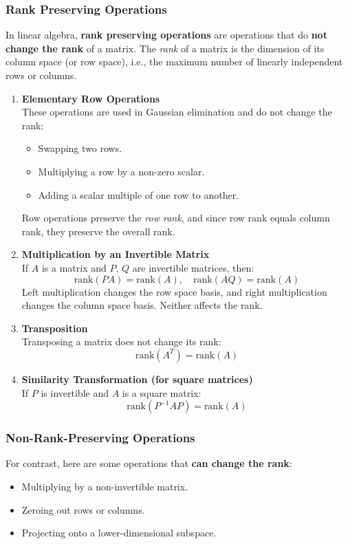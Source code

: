 \subsubsection{Rank Preserving Operations}

In linear algebra, \textbf{rank preserving operations} are operations that do \textbf{not change the rank} of a matrix. The \textit{rank} of a matrix is the dimension of its column space (or row space), i.e., the maximum number of linearly independent rows or columns.

\vspace{0.5em}


\begin{enumerate}
    \item \textbf{Elementary Row Operations} \\
    These operations are used in Gaussian elimination and do not change the rank:
    \begin{itemize}
        \item Swapping two rows.
        \item Multiplying a row by a non-zero scalar.
        \item Adding a scalar multiple of one row to another.
    \end{itemize}
    Row operations preserve the \textit{row rank}, and since row rank equals column rank, they preserve the overall rank.

    \item \textbf{Multiplication by an Invertible Matrix} \\
    If $A$ is a matrix and $P$, $Q$ are invertible matrices, then:
    \[
        \text{rank}(PA) = \text{rank}(A), \quad \text{rank}(AQ) = \text{rank}(A)
    \]
    Left multiplication changes the row space basis, and right multiplication changes the column space basis. Neither affects the rank.

    \item \textbf{Transposition} \\
    Transposing a matrix does not change its rank:
    \[
        \text{rank}(A^T) = \text{rank}(A)
    \]

    \item \textbf{Similarity Transformation (for square matrices)} \\
    If $P$ is invertible and $A$ is a square matrix:
    \[
        \text{rank}(P^{-1}AP) = \text{rank}(A)
    \]
\end{enumerate}

\subsubsection{Non-Rank-Preserving Operations}
For contrast, here are some operations that \textbf{can change the rank}:
\begin{itemize}
    \item Multiplying by a non-invertible matrix.
    \item Zeroing out rows or columns.
    \item Projecting onto a lower-dimensional subspace.
\end{itemize}


